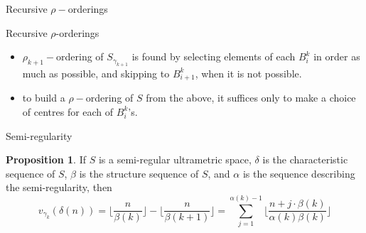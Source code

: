 \documentclass{beamer}
\theoremstyle{definition}
\newtheorem{proposition}{Proposition}
\begin{document}
\begin{frame}{Recursive $\rho-$orderings}
	\tikzset{font=\tiny,
	level distance=1.35cm,
}

\begin{center}
\end{center}
\end{frame}

\begin{frame}{Recursive $\rho$-orderings}
	

	\begin{itemize}
		\item $\rho_{k+1}-$ordering of $S_{\gamma_{k+1}}$ is found by selecting elements of each $B^k_i$ in order as much as possible, and skipping to $B^k_{i+1}$, when it is not possible.
		\pause
		\item  to build a $\rho-$ordering of $S$ from the above, it suffices only to make a choice of centres for each of $B^k_i$'s.
	\end{itemize}
\end{frame}


\begin{frame}{Semi-regularity}
\begin{proposition}
	If $S$ is a semi-regular ultrametric space, $\delta$ is the characteristic sequence of $S$, $\beta$ is the structure sequence of $S$, and $\alpha$ is the sequence describing the semi-regularity, then
	\[v_{\gamma_k}(\delta(n)) =  \lfloor\frac{n}{\beta(k)}\rfloor - \lfloor\frac{n}{\beta(k+1)}\rfloor = \sum_{j=1}^{\alpha(k)-1} \lfloor \frac{n + j\cdot \beta(k)}{\alpha(k)\beta(k)} \rfloor\]
\end{proposition}

\end{frame}
\end{document}
